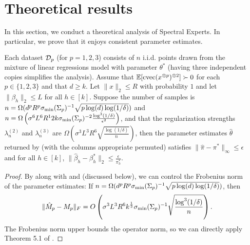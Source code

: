 \section{Theoretical results}



In this section, we conduct a theoretical analysis of Spectral Experts.
In particular, we prove that it enjoys consistent parameter estimates.
\begin{theorem}
  \label{thm:convergence}
Each dataset $\mathcal{D}_p$ (for $p = 1, 2, 3$) consists of $n$ i.i.d. points drawn from the mixture
of linear regressions model with parameter $\theta^*$
(having three independent copies simplifies the analysis).
Assume that $\operatorname{\mathbb{E}}[\operatorname{cvec}(x^{\otimes p})^{\otimes 2}] \succ 0$ for each $p \in \{1,2,3\}$
and that $d \ge k$.
Let $\|x\|_2 \le R$ with probability $1$
and let $\|\beta_h\|_2 \le L$ for all $h \in [k]$.
Suppose the number of samples is
$n = \Omega(d^p R^p \sigma_\text{\rm min}(\Sigma_p)^{-1} \sqrt{p \log(d) \log(1/\delta)})$ and
$n = \Omega\left( \sigma^6 L^6 R^12 k \sigma_\text{\rm min}(\Sigma_p)^{-2} \frac{\log^3 (1/\delta)}{\epsilon^2} \right)$,
and that the regularization strengths $\lambda_n^{(2)}$ and $\lambda_n^{(3)}$ are
$\Omega(\sigma^3 L^3 R^6 \sqrt{\frac{\log(1/\delta)}{n}})$,
then the parameter estimates $\hat\theta$ returned by
 (with the columns appropriate permuted)
satisfies 
$\|\hat\pi - \pi^*\|_{\infty} \le \epsilon$
and for all $h \in [k]$,
$\|\hat\beta_h - \beta^*_h\|_2 \le \frac{\epsilon}{\pi_h^*}$.
\end{theorem}

\begin{proof}
By  along with  and  (discussed below),
we can control the Frobenius norm of the parameter estimates:
If $n = \Omega(d^p R^p \sigma_\text{\rm min}(\Sigma_p)^{-1} \sqrt{p \log(d) \log(1/\delta)})$, then
\begin{align}
  \|\hat M_p - M_p\|_F = O\left( \sigma^3 L^3 R^6 k^{\frac12} \sigma_\text{\rm min}(\Sigma_p)^{-1} \sqrt{\frac{\log^3 (1/\delta)}{n}} \right).
\end{align}
The Frobenius norm upper bounds the operator norm,
so we can directly apply Theorem 5.1 of \cite{AnandkumarGeHsu2012}.
\end{proof}

